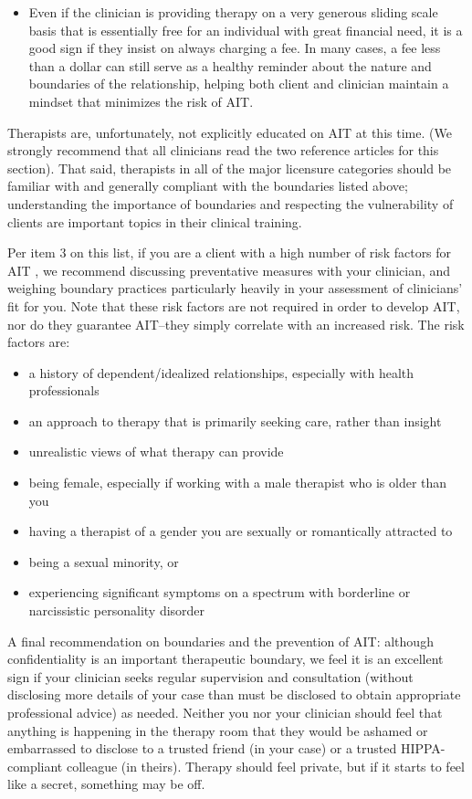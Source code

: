 \documentclass[12pt,letterpaper]{book}
\begin{document}
\begin{itemize}
    \item Even if the clinician is providing therapy on a very generous sliding scale basis that is essentially free for an individual with great financial need, it is a good sign if they insist on always charging a fee. In many cases, a fee less than a dollar can still serve as a healthy reminder about the nature and boundaries of the relationship, helping both client and clinician maintain a mindset that minimizes the risk of AIT.
\end{itemize}
Therapists are, unfortunately, not explicitly educated on AIT at this time. (We strongly recommend that all clinicians read the two reference articles for this section). That said, therapists in all of the major licensure categories should be familiar with and generally compliant with the boundaries listed above; understanding the importance of boundaries and respecting the vulnerability of clients are important topics in their clinical training.

Per item 3 on this list, if you are a client with a high number of risk factors for AIT \cite{transferranceLoveHarm,hook2018boundary}, we recommend discussing preventative measures with your clinician, and weighing boundary practices particularly heavily in your assessment of clinicians' fit for you. Note that these risk factors are not required in order to develop AIT, nor do they guarantee AIT--they simply correlate with an increased risk. The risk factors are:
\begin{itemize}
    \item a history of dependent/idealized relationships, especially with health professionals
    \item an approach to therapy that is primarily seeking care, rather than insight
    \item unrealistic views of what therapy can provide
    \item being female, especially if working with a male therapist who is older than you
    \item having a therapist of a gender you are sexually or romantically attracted to
    \item being a sexual minority, or
    \item experiencing significant symptoms on a spectrum with borderline or narcissistic personality disorder
\end{itemize}

A final recommendation on boundaries and the prevention of AIT: although confidentiality is an important therapeutic boundary, we feel it is an excellent sign if your clinician seeks regular supervision and consultation (without disclosing more details of your case than must be disclosed to obtain appropriate professional advice) as needed. Neither you nor your clinician should feel that anything is happening in the therapy room that they would be ashamed or embarrassed to disclose to a trusted friend (in your case) or a trusted HIPPA-compliant colleague (in theirs). Therapy should feel private, but if it starts to feel like a secret, something may be off.
\end{document}
